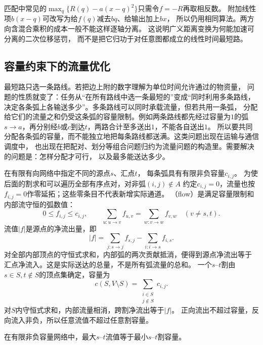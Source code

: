 匹配中常见的$\max_q\{R(q)-a(x-q)^2\}$只需令$f=-R$再取相反数。
附加线性项$b(x-q)$可改写为给$f(q)$减去$bq$、给输出加上$bx$，
所以仍用相同算法。两方向含混合乘积的成本一般不能这样逐轴分离。
这说明广义距离变换为何能加速可分离的二次位移惩罚，
而不是把它归功于对任意图都成立的线性时间最短路。

\subsection{容量约束下的流量优化}

最短路只选一条路线。若把边上附的数字理解为单位时间允许通过的物资量，
问题的性质就变了：任务从“在所有路线中选一条最短的”变成“同时利用多条路线，
决定各条弧上各输送多少”。多条路线可以同时承载流量，但若共用一条弧，
分配给它们的流量之和仍受这条弧的容量限制。例如两条路线都先经过容量为$1$的弧
$s\to a$，再分别经$b$或$c$到达$t$，两路合计至多送出$1$，不能各自送出$1$。
所以要共同分配各条弧的容量，而不能独立地把每条路线都送满。这类问题出现在运输与通信调度中，
也出现在把配对、划分等组合问题归约为流量问题的构造里。需要解决的问题是：怎样分配才可行，
以及最多能送达多少。

在有限有向网络中指定不同的源点\(s\)、汇点\(t\)，
每条弧具有有限非负容量\(c_{i,j}\)。
为使后面的割求和可以遍历全部有序点对，对非弧\((i,j)\notin A\)
约定\(c_{i,j}=0\)，流量也按\(f_{i,j}=0\)作零延拓；这些零条目不代表新增实际通道。
（flow）是满足容量限制和内部流守恒的弧数值：
\[
  0\leq f_{i,j}\leq c_{i,j},\qquad
  \sum_{u:u\to v}f_{u,v}
  =\sum_{w:v\to w}f_{v,w}\quad(v\neq s,t).
\]
流值\(|f|\)是源点的净流出量，即
\[
  |f|=\sum_{j:s\to j}f_{s,j}-\sum_{i:i\to s}f_{i,s}.
\]
对全部内部顶点的守恒式求和，内部弧的两次贡献抵消，便得到源点净流出等于
汇点净流入。这是实际送达的总量，不是所有弧流量的总和。
一个\(s\)--\(t\)割由\(s\in S,t\notin S\)的顶点集确定，容量为
\[
  c(S,V\setminus S)=\sum_{\substack{i\in S\\j\notin S}}c_{i,j}.
\]
对\(S\)内守恒式求和，内部流量相消，跨割净流出等于\(|f|\)。
正向流出不超过容量，反向流入非负，所以任意流值不超过任意割容量。

\begin{theorem}[最大流最小割定理]
  \label{thm:graph-theory-max-flow-min-cut}
  在有限非负容量网络中，最大\(s\)--\(t\)流值等于最小\(s\)--\(t\)割容量。
\end{theorem}

